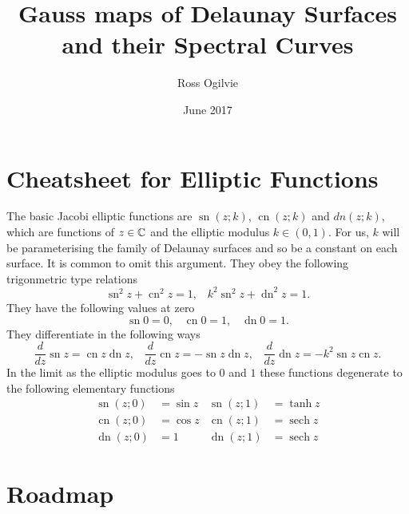 \documentclass[a4paper,11pt]{article}
\title{Gauss maps of Delaunay Surfaces and their Spectral Curves}
\author{Ross Ogilvie}
\date{June 2017}
\DeclareMathOperator{\sech}{sech}
\DeclareMathOperator{\sn}{sn}
\DeclareMathOperator{\cn}{cn}
\DeclareMathOperator{\dn}{dn}
\begin{document}
\maketitle

\section*{Cheatsheet for Elliptic Functions}
The basic Jacobi elliptic functions are $\sn(z;k)$, $\cn(z;k)$ and $dn(z;k)$, which are functions of $z\in\C$ and the elliptic modulus $k\in(0,1)$. For us, $k$ will be parameterising the family of Delaunay surfaces and so be a constant on each surface. It is common to omit this argument. They obey the following trigonmetric type relations
\[
\sn^2 z + \cn^2 z = 1,\;\;\; k^2 \sn^2 z  + \dn^2 z = 1.
\]
They have the following values at zero
\[
\sn 0 = 0, \;\;\; \cn 0 = 1, \;\;\; \dn 0 = 1.
\]
They differentiate in the following ways
\[
\frac{d}{dz}\sn z = \cn z \dn z, \;\;\;
\frac{d}{dz}\cn z = -\sn z \dn z, \;\;\;
\frac{d}{dz}\dn z = -k^2\sn z \cn z.
\]
In the limit as the elliptic modulus goes to $0$ and $1$ these functions degenerate to the following elementary functions
\begin{align*}
\sn(z;0) &= \sin z & \sn(z;1) &= \tanh z \\
\cn(z;0) &= \cos z & \cn(z;1) &= \sech z \\
\dn(z;0) &= 1 & \dn(z;1) &= \sech z
\end{align*}











\section*{Roadmap}
\end{document}
